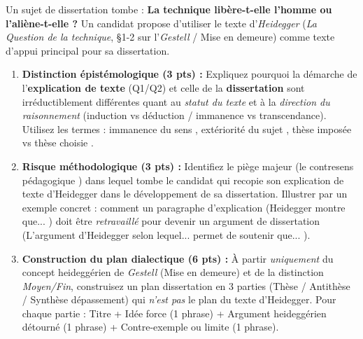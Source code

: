 \documentclass[11pt]{article}
\begin{document}
\begin{exercice}
Un sujet de dissertation tombe : \og \textbf{La technique libère-t-elle l'homme ou l'aliène-t-elle ?} \fg Un candidat propose d'utiliser le texte d'\textit{Heidegger} (\textit{La Question de la technique}, \S 1-2 sur l'\textit{Gestell} / Mise en demeure) comme \og texte d'appui \fg principal pour sa dissertation.

\begin{enumerate}
    \item \textbf{Distinction épistémologique (3 pts) :} Expliquez pourquoi la démarche de l'\textbf{explication de texte} (Q1/Q2) et celle de la \textbf{dissertation} sont irréductiblement différentes quant au \textit{statut du texte} et à la \textit{direction du raisonnement} (induction vs déduction / immanence vs transcendance). Utilisez les termes : \og immanence du sens \fg, \og extériorité du sujet \fg, \og thèse imposée vs thèse choisie \fg.
    \item \textbf{Risque méthodologique (3 pts) :} Identifiez le piège majeur (le \og contresens pédagogique \fg) dans lequel tombe le candidat qui recopie son explication de texte d'Heidegger dans le développement de sa dissertation. Illustrer par un exemple concret : comment un paragraphe d'explication (\og Heidegger montre que... \fg) doit être \textit{retravaillé} pour devenir un argument de dissertation (\og L'argument d'Heidegger selon lequel... permet de soutenir que... \fg).
    \item \textbf{Construction du plan dialectique (6 pts) :} À partir \textit{uniquement} du concept heideggérien de \textit{Gestell} (Mise en demeure) et de la distinction \textit{Moyen/Fin}, construisez un plan dissertation en 3 parties (Thèse / Antithèse / Synthèse dépassement) qui \textit{n'est pas} le plan du texte d'Heidegger. Pour chaque partie : Titre + Idée force (1 phrase) + Argument heideggérien détourné (1 phrase) + Contre-exemple ou limite (1 phrase).
\end{enumerate}
\end{exercice}
\end{document}
